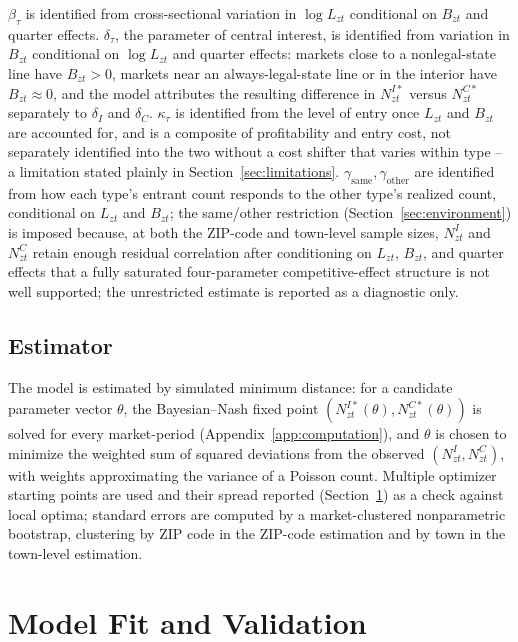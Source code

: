 \documentclass[english,12pt]{article}
\begin{document}
$\beta_\tau$ is identified from cross-sectional variation in $\log L_{zt}$ conditional on $B_{zt}$ and quarter effects. $\delta_\tau$, the parameter of central interest, is identified from variation in $B_{zt}$ conditional on $\log L_{zt}$ and quarter effects: markets close to a nonlegal-state line have $B_{zt}>0$, markets near an always-legal-state line or in the interior have $B_{zt}\approx0$, and the model attributes the resulting difference in $N^{I*}_{zt}$ versus $N^{C*}_{zt}$ separately to $\delta_I$ and $\delta_C$. $\kappa_\tau$ is identified from the level of entry once $L_{zt}$ and $B_{zt}$ are accounted for, and is a composite of profitability and entry cost, not separately identified into the two without a cost shifter that varies within type -- a limitation stated plainly in Section~\ref{sec:limitations}. $\gamma_{\text{same}}, \gamma_{\text{other}}$ are identified from how each type's entrant count responds to the other type's realized count, conditional on $L_{zt}$ and $B_{zt}$; the same/other restriction (Section~\ref{sec:environment}) is imposed because, at both the ZIP-code and town-level sample sizes, $N^I_{zt}$ and $N^C_{zt}$ retain enough residual correlation after conditioning on $L_{zt}$, $B_{zt}$, and quarter effects that a fully saturated four-parameter competitive-effect structure is not well supported; the unrestricted estimate is reported as a diagnostic only.

\subsection{Estimator}

The model is estimated by simulated minimum distance: for a candidate parameter vector $\theta$, the Bayesian--Nash fixed point $(N^{I*}_{zt}(\theta), N^{C*}_{zt}(\theta))$ is solved for every market-period (Appendix~\ref{app:computation}), and $\theta$ is chosen to minimize the weighted sum of squared deviations from the observed $(N^I_{zt}, N^C_{zt})$, with weights approximating the variance of a Poisson count. Multiple optimizer starting points are used and their spread reported (Section~\ref{sec:modelfit}) as a check against local optima; standard errors are computed by a market-clustered nonparametric bootstrap, clustering by ZIP code in the ZIP-code estimation and by town in the town-level estimation.

\section{Model Fit and Validation}
\label{sec:modelfit}
\end{document}
